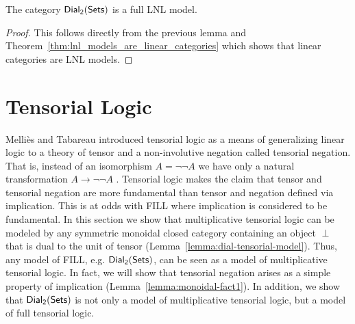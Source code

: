 \begin{corollary}
  \label{corollary:dial-FLNL}
  The category $\mathsf{Dial_2}(\mathsf{Sets})$ is a full LNL model.
\end{corollary}
\begin{proof}
  This follows directly from the previous lemma and
  Theorem~\ref{thm:lnl_models_are_linear_categories} which shows that
  linear categories are LNL models.
\end{proof}


\section{Tensorial Logic}
\label{sec:tensor_logic}

Melli\`es and Tabareau introduced tensorial logic as a means of
generalizing linear logic to a theory of tensor and a non-involutive
negation called tensorial negation.  That is, instead of an
isomorphism $A = \lnot\lnot A$ we have only a natural transformation
$A \to \lnot\lnot A$ \cite{Mellies:2008}.  Tensorial logic makes the
claim that tensor and tensorial negation are more fundamental than
tensor and negation defined via implication.  This is at odds with
FILL where implication is considered to be fundamental.  In this
section we show that multiplicative tensorial logic can be modeled by
any symmetric monoidal closed category containing an object $\perp$
that is dual to the unit of tensor
(Lemma~\ref{lemma:dial-tensorial-model}).  Thus, any model of FILL,
e.g. $\mathsf{Dial_2}(\mathsf{Sets})$, can be seen as a model of multiplicative tensorial
logic.  In fact, we will show that tensorial negation arises as a
simple property of implication (Lemma~\ref{lemma:monoidal-fact1}).  In
addition, we show that $\mathsf{Dial_2}(\mathsf{Sets})$ is not only a model of multiplicative
tensorial logic, but a model of full tensorial logic.

